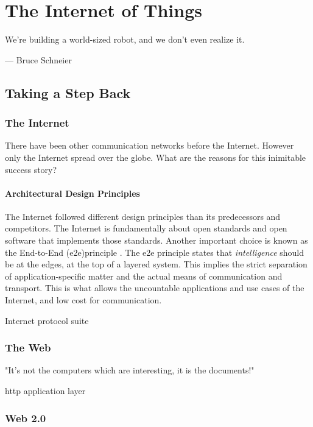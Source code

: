 \chapter{The Internet of Things}
\label{sec:iot}

\epigraph{We're building a world-sized robot, and we don't even realize it.}{--- \textup{Bruce Schneier}}

\section{Taking a Step Back}

\subsection{The Internet}

There have been other communication networks before the Internet. However only the Internet spread over the globe. What are the reasons for this inimitable success story?

\subsubsection{Architectural Design Principles}

The Internet followed different design principles than its predecessors and competitors. The Internet is fundamentally about open standards and open software that implements those standards. Another important choice is known as the End-to-End (e2e)principle \cite{Saltzer:1984:EAS:357401.357402}. The e2e principle states that \emph{intelligence} should be at the edges, at the top of a layered system. This implies the strict separation of application-specific matter and the actual means of communication and transport. This is what allows the uncountable applications and use cases of the Internet, and low cost for communication.

Internet protocol suite

\subsection{The Web}
"It's not the computers which are interesting, it is the documents!"

http application layer


\subsection{Web 2.0}

